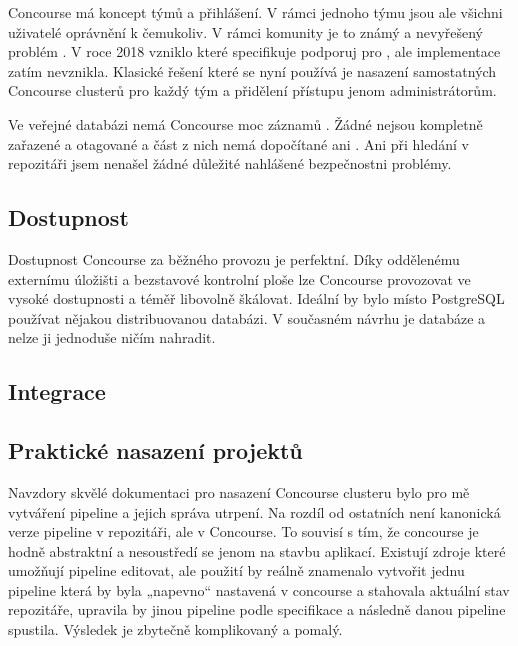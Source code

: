         Concourse má koncept týmů a přihlášení. V rámci jednoho týmu jsou ale všichni uživatelé oprávnění k čemukoliv. V rámci komunity je to známý a nevyřešený problém \cite{concourse-issue-1317}. V roce 2018 vzniklo  které specifikuje podporuj pro , ale implementace zatím nevznikla. Klasické řešení které se nyní používá je nasazení samostatných Concourse clusterů pro každý tým a přidělení přístupu jenom administrátorům.

        Ve veřejné databázi  nemá Concourse moc záznamů \cite{cve-concourse}. Žádné nejsou kompletně zařazené a otagované a část z nich nemá dopočítané ani . Ani při hledání v repozitáři jsem nenašel žádné důležité nahlášené bezpečnostni problémy.

    \subsection{Dostupnost}
        Dostupnost Concourse za běžného provozu je perfektní. Díky oddělenému externímu úložišti a bezstavové kontrolní ploše lze Concourse provozovat ve vysoké dostupnosti a téměř libovolně škálovat. Ideální by bylo místo PostgreSQL používat nějakou distribuovanou  databázi. V současném návrhu je databáze  a nelze ji jednoduše ničím nahradit.

        \blind[1]
        \blind[1]

    \subsection{Integrace}
        \blind[1]
        \blind[1]
        \blind[1]

    \subsection{Praktické nasazení projektů}
        Navzdory skvělé dokumentaci pro nasazení Concourse clusteru bylo pro mě vytváření pipeline a jejich správa utrpení. Na rozdíl od ostatních \CI není kanonická verze pipeline v repozitáři, ale v Concourse. To souvisí s tím, že concourse je hodně abstraktní a nesoustředí se jenom na stavbu aplikací. Existují zdroje \cite{concourse-pipeline-res} které umožňují pipeline editovat, ale použití by reálně znamenalo vytvořit jednu pipeline která by byla „napevno“ nastavená v concourse a stahovala aktuální stav repozitáře, upravila by jinou pipeline podle specifikace a následně danou pipeline spustila. Výsledek je zbytečně komplikovaný a pomalý.

